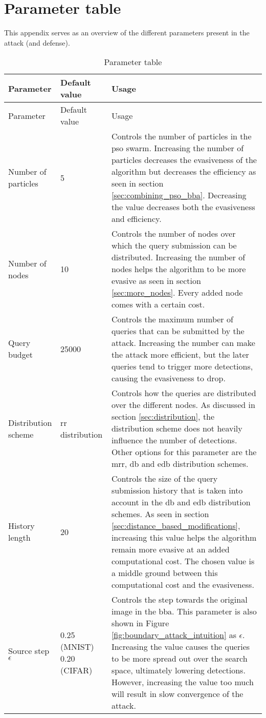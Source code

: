 \chapter{Parameter table}
This appendix serves as an overview of the different parameters present in the attack (and defense). 
\centering
\renewcommand*{\arraystretch}{1.7}
\begin{longtable}{p{3cm}p{2.5cm}p{7cm}}
\caption{Parameter table}
\label{tbl:parameter_table}\\
\toprule
Parameter &Default value &Usage \\ \midrule \endfirsthead
\toprule
Parameter &Default value &Usage \\ \midrule \endhead
\bottomrule\endfoot
Number of  particles	&5 &Controls the number of particles in the \gls{pso} swarm. Increasing the number of particles decreases the evasiveness of the algorithm but decreases the efficiency as seen in section \ref{sec:combining_pso_bba}. Decreasing the value decreases both the evasiveness and efficiency.\\
Number of nodes &10 &Controls the number of nodes over which the query submission can be distributed. Increasing the number of nodes helps the algorithm to be more evasive as seen in section \ref{sec:more_nodes}. Every added node comes with a certain cost.\\
Query budget &25000 &Controls the maximum number of queries that can be submitted by the attack. Increasing the number can make the attack more efficient, but the later queries tend to trigger more detections, causing the evasiveness to drop.\\
Distribution scheme &\gls{rr} distribution &Controls how the queries are distributed over the different nodes. As discussed in section \ref{sec:distribution}, the distribution scheme does not heavily influence the number of detections. Other options for this parameter are the \gls{mrr}, \gls{db} and \gls{edb} distribution schemes.\\
History length	&20	&Controls the size of the query submission history that is taken into account in the \gls{db} and \gls{edb} distribution schemes. As seen in section \ref{sec:distance_based_modifications}, increasing this value helps the algorithm remain more evasive at an added computational cost. The chosen value is a middle ground between this computational cost and the evasiveness.\\
Source step $\epsilon$ &0.25 (MNIST) 0.20 (CIFAR) & Controls the step towards the original image in the \gls{bba}. This parameter is also shown in Figure \ref{fig:boundary_attack_intuition} as $\epsilon$. Increasing the value causes the queries to be more spread out over the search space, ultimately lowering detections. However, increasing the value too much will result in slow convergence of the attack.\\

\end{longtable}
